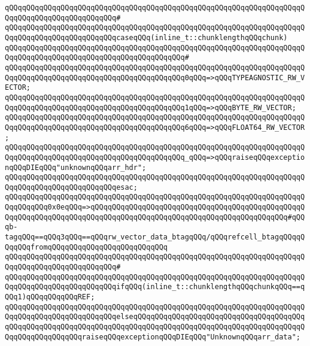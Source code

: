 \verb|qQQqqQQqqQQqqQQqqQQqqQQqqQQqqQQqqQQqqQQqqQQqqQQqqQQqqQQqqQQqqQQqqQQqqQQqqQQqqQQqqQQqqQQqqQQqqQQq#|\newline
\verb|qQQqqQQqqQQqqQQqqQQqqQQqqQQqqQQqqQQqqQQqqQQqqQQqqQQqqQQqqQQqqQQqqQQqqQQqqQQqqQQqqQQqqQQqqQQqqQQqcaseqQQq(inline_t::chunklengthqQQqchunk)|\newline
\verb|qQQqqQQqqQQqqQQqqQQqqQQqqQQqqQQqqQQqqQQqqQQqqQQqqQQqqQQqqQQqqQQqqQQqqQQqqQQqqQQqqQQqqQQqqQQqqQQqqQQqqQQqqQQqqQQq#|\newline
\verb|qQQqqQQqqQQqqQQqqQQqqQQqqQQqqQQqqQQqqQQqqQQqqQQqqQQqqQQqqQQqqQQqqQQqqQQqqQQqqQQqqQQqqQQqqQQqqQQqqQQqqQQqqQQqqQQq0qQQq=>qQQqTYPEAGNOSTIC_RW_VECTOR;|\newline
\verb|qQQqqQQqqQQqqQQqqQQqqQQqqQQqqQQqqQQqqQQqqQQqqQQqqQQqqQQqqQQqqQQqqQQqqQQqqQQqqQQqqQQqqQQqqQQqqQQqqQQqqQQqqQQqqQQq1qQQq=>qQQqBYTE_RW_VECTOR;|\newline
\verb|qQQqqQQqqQQqqQQqqQQqqQQqqQQqqQQqqQQqqQQqqQQqqQQqqQQqqQQqqQQqqQQqqQQqqQQqqQQqqQQqqQQqqQQqqQQqqQQqqQQqqQQqqQQqqQQq6qQQq=>qQQqFLOAT64_RW_VECTOR;|\newline
\verb|qQQqqQQqqQQqqQQqqQQqqQQqqQQqqQQqqQQqqQQqqQQqqQQqqQQqqQQqqQQqqQQqqQQqqQQqqQQqqQQqqQQqqQQqqQQqqQQqqQQqqQQqqQQqqQQq_qQQq=>qQQqraiseqQQqexceptionqQQqDIEqQQq"unknownqQQqarr_hdr";|\newline
\verb|qQQqqQQqqQQqqQQqqQQqqQQqqQQqqQQqqQQqqQQqqQQqqQQqqQQqqQQqqQQqqQQqqQQqqQQqqQQqqQQqqQQqqQQqqQQqqQQqesac;|\newline
\newline
\verb|qQQqqQQqqQQqqQQqqQQqqQQqqQQqqQQqqQQqqQQqqQQqqQQqqQQqqQQqqQQqqQQqqQQqqQQqqQQqqQQq0x0eqQQq=>qQQqqQQqqQQqqQQqqQQqqQQqqQQqqQQqqQQqqQQqqQQqqQQqqQQqqQQqqQQqqQQqqQQqqQQqqQQqqQQqqQQqqQQqqQQqqQQqqQQqqQQqqQQqqQQqqQQq#qQQqb-tagqQQq==qQQq3qQQq==qQQqrw_vector_data_btagqQQq/qQQqrefcell_btagqQQqqQQqqQQqfromqQQqqQQqqQQqqQQqqQQqqQQqqQQq|\newline
\verb|qQQqqQQqqQQqqQQqqQQqqQQqqQQqqQQqqQQqqQQqqQQqqQQqqQQqqQQqqQQqqQQqqQQqqQQqqQQqqQQqqQQqqQQqqQQqqQQq#|\newline
\verb|qQQqqQQqqQQqqQQqqQQqqQQqqQQqqQQqqQQqqQQqqQQqqQQqqQQqqQQqqQQqqQQqqQQqqQQqqQQqqQQqqQQqqQQqqQQqqQQqifqQQq(inline_t::chunklengthqQQqchunkqQQq==qQQq1)qQQqqQQqqQQqREF;|\newline
\verb|qQQqqQQqqQQqqQQqqQQqqQQqqQQqqQQqqQQqqQQqqQQqqQQqqQQqqQQqqQQqqQQqqQQqqQQqqQQqqQQqqQQqqQQqqQQqqQQqelseqQQqqQQqqQQqqQQqqQQqqQQqqQQqqQQqqQQqqQQqqQQqqQQqqQQqqQQqqQQqqQQqqQQqqQQqqQQqqQQqqQQqqQQqqQQqqQQqqQQqqQQqqQQqqQQqqQQqqQQqqQQqqQQqraiseqQQqexceptionqQQqDIEqQQq"UnknownqQQqarr_data";|\newline
